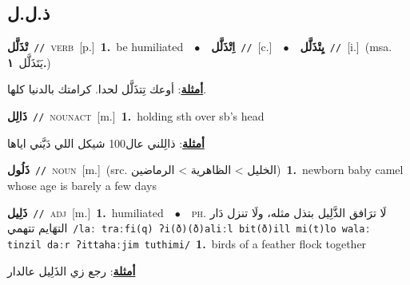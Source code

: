 \documentclass[10pt,a4paper,twoside]{article} %
\begin{document}
\begin{multicols}{2}
\vspace{-3mm}
\subsection*{\color{blue}\foreignlanguage{arabic}{ذ.ل.ل}\color{blue}{}} 

{\setlength\topsep{0pt}\textbf{\foreignlanguage{arabic}{تْذَلَّل}}\ {\color{gray}\texttt{//}\color{black}}\ \textsc{verb}\ [p.]\ \textbf{1.}~be humiliated\ \ $\bullet$\ \ \setlength\topsep{0pt}\textbf{\foreignlanguage{arabic}{اِتْذَلَّل}}\ {\color{gray}\texttt{//}\color{black}}\ [c.]\ \ $\bullet$\ \ \setlength\topsep{0pt}\textbf{\foreignlanguage{arabic}{يِتْذَلَّل}}\ {\color{gray}\texttt{//}\color{black}}\ [i.]\ \color{gray}(msa. \foreignlanguage{arabic}{يَتَذَلَّل}~\foreignlanguage{arabic}{\textbf{١.}})\color{black}\  \begin{flushright}\color{gray}\foreignlanguage{arabic}{\textbf{\underline{\foreignlanguage{arabic}{أمثلة}}}: أوعك تِتذَلَّل لحدا. كرامتك بالدنيا كلها.}\end{flushright}\color{black}} \vspace{2mm}

{\setlength\topsep{0pt}\textbf{\foreignlanguage{arabic}{ذَالِل}}\ {\color{gray}\texttt{//}\color{black}}\ \textsc{noun\textunderscore act}\ [m.]\ \textbf{1.}~holding sth over sb's head\  \begin{flushright}\color{gray}\foreignlanguage{arabic}{\textbf{\underline{\foreignlanguage{arabic}{أمثلة}}}: ذالِلني عال100 شيكل اللي دَيَّني اياها}\end{flushright}\color{black}} \vspace{2mm}

{\setlength\topsep{0pt}\textbf{\foreignlanguage{arabic}{ذَلُول}}\ {\color{gray}\texttt{//}\color{black}}\ \textsc{noun}\ [m.]\ (src. \color{gray}\foreignlanguage{arabic}{الخليل > الظاهرية > الرماضين}\color{black})\ \textbf{1.}~newborn baby camel whose age is barely a few days\ } \vspace{2mm}

{\setlength\topsep{0pt}\textbf{\foreignlanguage{arabic}{ذَلِيل}}\ {\color{gray}\texttt{//}\color{black}}\ \textsc{adj}\ [m.]\ \textbf{1.}~humiliated\ \ $\bullet$\ \ \textsc{ph.} \color{gray} \foreignlanguage{arabic}{لَا ترَافق الذَّلِيل بتذل مثله، ولَا تنزل دَار التهَايم تتهمي}\color{black}\ {\color{gray}\texttt{/{\sffamily laː traːfi(q) ʔi(ð)(ð)aliːl bit(ð)ill mi(t)lo walaː tinzil daːr ʔittahaːjim tuthimi}/}\color{black}}\ \textbf{1.}~birds of a feather flock together\  \begin{flushright}\color{gray}\foreignlanguage{arabic}{\textbf{\underline{\foreignlanguage{arabic}{أمثلة}}}: رجع زي الذَلِيل عالدار}\end{flushright}\color{black}} \vspace{2mm}


\end{multicols}
\end{document}
